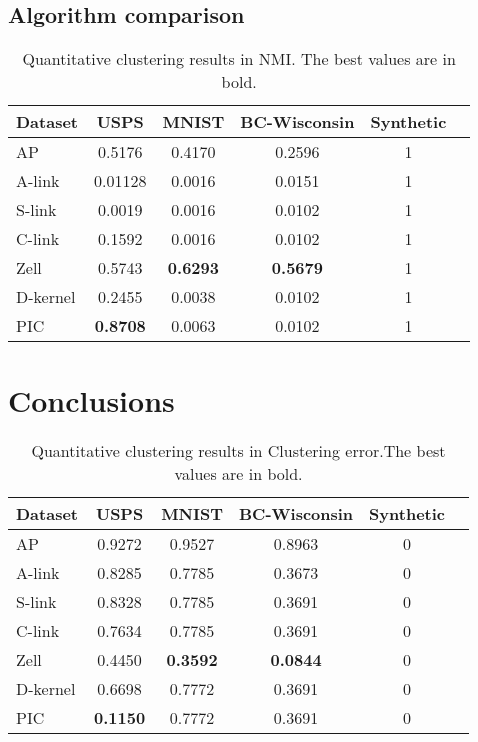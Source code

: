\documentclass[
	10pt,
	parskip=half-,	
	paper=a4,
	english
	]{scrartcl}
\begin{document}
\subsection{Algorithm comparison}

\begin{table}[h]
    \centering
    \caption{Quantitative clustering results in NMI. The best values are in bold.}
    \begin{tabular}{lccccc}
    \toprule
    \textbf{Dataset} & \textbf{USPS} & \textbf{MNIST} & \textbf{BC-Wisconsin} & \textbf{Synthetic}\\
    \midrule
    AP       & 0.5176   & 0.4170 & 0.2596  & 1 \\
    A-link   & 0.01128  & 0.0016 & 0.0151  & 1   \\
    S-link   & 0.0019   & 0.0016 & 0.0102  & 1 \\
    C-link   & 0.1592   & 0.0016 & 0.0102  & 1 \\
    Zell     & 0.5743   & \textbf{0.6293} & \textbf{0.5679}  & 1 \\
    D-kernel & 0.2455   & 0.0038 & 0.0102  & 1 \\
    PIC & \textbf{0.8708} & 0.0063 & 0.0102 & 1 \\
    \bottomrule
    \end{tabular}
    \end{table}

\section{Conclusions}

\begin{table}[h]
    \centering
    \caption{Quantitative clustering results in Clustering error.The best values are in bold.}
    \begin{tabular}{lccccc}
    \toprule
    \textbf{Dataset} & \textbf{USPS} & \textbf{MNIST} & \textbf{BC-Wisconsin} & \textbf{Synthetic}\\
    \midrule
    AP       & 0.9272   & 0.9527 & 0.8963  & 0 \\
    A-link   & 0.8285  & 0.7785 & 0.3673  & 0   \\
    S-link   & 0.8328   & 0.7785 & 0.3691  & 0 \\
    C-link   & 0.7634   & 0.7785 & 0.3691  & 0 \\
    Zell     & 0.4450   & \textbf{0.3592} & \textbf{0.0844}  & 0 \\
    D-kernel & 0.6698   & 0.7772 & 0.3691  & 0 \\
    PIC & \textbf{0.1150} & 0.7772 & 0.3691 & 0 \\
    \bottomrule
    \end{tabular}
    \end{table}
\end{document}
